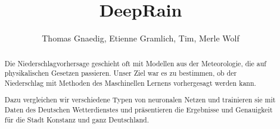 \documentclass[11pt]{article}
\title{DeepRain}
\author{Thomas Gnaedig, Etienne Gramlich, Tim, Merle Wolf}
\begin{document}
\maketitle
\tableofcontents

\begin{abstract}
Die Niederschlagvorhersage geschieht oft mit Modellen aus der Meteorologie, die auf physikalischen Gesetzen passieren. Unser Ziel war es zu bestimmen, ob der Niederschlag mit Methoden des Maschinellen Lernens vorhergesagt werden kann.

Dazu vergleichen wir verschiedene Typen von neuronalen Netzen und trainieren sie mit Daten des Deutschen Wetterdienstes und präsentieren die Ergebnisse und Genauigkeit für die Stadt Konstanz und ganz Deutschland.
\end{abstract}









\newpage
\listoffigures
\listoftables
\end{document}
